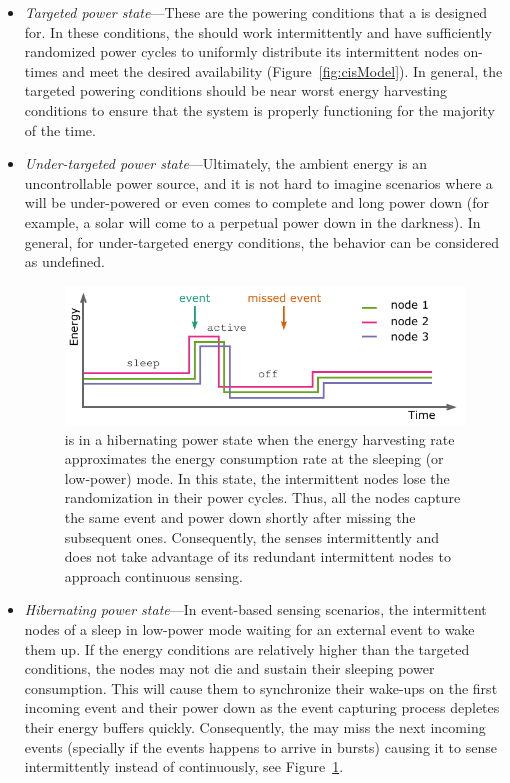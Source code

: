 \begin{itemize}
		\item \textit{Targeted power state}---These are the powering conditions that a \sys is designed for. In these  conditions, the \sys should work intermittently and have sufficiently randomized power cycles to uniformly distribute its intermittent nodes on-times and meet the desired availability (Figure~\ref{fig:cisModel}). In general, the targeted powering conditions should be near worst energy harvesting conditions to ensure that the system is properly functioning for the majority of the time.
		\item \textit{Under-targeted power state}---Ultimately, the ambient energy is an uncontrollable power source, and it is not hard to imagine scenarios where a \sys will be under-powered or even comes to complete and long power down (for example, a solar \sys will come to a perpetual power down in the darkness). In general, for under-targeted energy conditions, the \sys behavior can be considered as undefined.
%
\begin{figure}
		\centering
		\includegraphics[width=\columnwidth]{figures/hibernating_power_state}
		\caption{\fullsys is in a hibernating power state when the energy harvesting rate approximates the energy consumption rate at the sleeping (or low-power) mode. In this state, the intermittent nodes lose the randomization in their power cycles. Thus, all the nodes capture the same event and power down shortly after missing the subsequent ones. Consequently, the \sys senses intermittently and does not take advantage of its redundant intermittent nodes to approach continuous sensing.}
		\label{fig:noRand}
\end{figure} 
%
		\item \label{it:hibernating} \textit{Hibernating power state}---In event-based sensing scenarios, the intermittent nodes of a \sys sleep in low-power mode waiting for an external event to wake them up. If the energy conditions are relatively higher than the targeted conditions, the nodes may not die and sustain their sleeping power consumption. This will cause them to synchronize their wake-ups on the first incoming event and their power down as the event capturing process depletes their energy buffers quickly. Consequently, the \sys may miss the next incoming events (specially if the events happens to arrive in bursts) causing it to sense intermittently instead of continuously, see Figure~\ref{fig:noRand}. 

\end{itemize}
